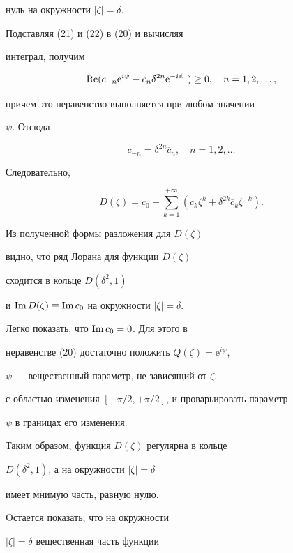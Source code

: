 \begin{pf}
нуль на окружности $|\zeta|=\delta$.


Подставляя (21) и (22) в (20) и вычисляя


интеграл, получим


$$


\re (c_{-n}\mathrm e^{i\psi}-c_{n}\delta^{2n}\mathrm e^{-i\psi}~)\ge 0,


\quad n=1,2,\dotsc,


$$


причем это неравенство выполняется при любом значении


$\psi$. Отсюда


$$


c_{-n}=\delta^{2n}\overline{c}_{n},\quad n=1,2,\dotsc


$$


Следовательно, 


$$


D(\zeta)=c_{0}+\sum\limits_{k=1}^{+\infty}(c_{k}\zeta^{k}+


\delta^{2k}\overline{c}_{k}\zeta^{-k}).


$$


Из полученной формы разложения для $D(\zeta)$ 


видно, что ряд Лорана для функции $D(\zeta)$


сходится в кольце $D(\delta^{2},1)$


и $\operatorname{Im} D(\zeta)\equiv \operatorname{Im} c_{0}$ на окружности $|\zeta|=\delta$.





Легко показать, что $\operatorname{Im} c_{0}=0$. Для этого в  


неравенстве (20) достаточно положить $Q(\zeta)=\mathrm e^{i\psi}$,


$\psi$ --- вещественный параметр, не зависящий от $\zeta$,


с областью изменения $[-\pi/2, +\pi/2]$, и проварьировать параметр 


$\psi$ в границах его изменения. 


Таким образом, функция $D(\zeta)$ регулярна в кольце


$D(\delta^{2},1)$, а на окружности $|\zeta|=\delta$


имеет мнимую часть, равную нулю.





Oстается показать, что на окружности


$|\zeta|=\delta$ вещественная часть функции



\end{pf}
